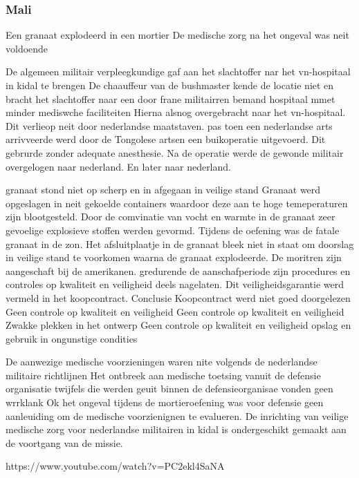 \cite{noauthor_2022-nm}
\cite{zetter2016GridHack}



\subsubsection{Mali}
Een granaat explodeerd in een mortier
De medische zorg na het ongeval was neit voldoende


De algemeen militair verpleegkundige gaf aan het slachtoffer nar het vn-hospitaal in kidal te brengen
De chaauffeur van de bushmaster kende de locatie niet  en bracht het slachtoffer naar een door frane militairren bemand hospitaal mmet minder mediswche faciliteiten
Hierna alsnog overgebracht naar het vn-hospitaal.
Dit verlieop  neit door nederlandse maatstaven.
pas toen een nederlandse arts arrivveerde werd door de Tongolese artsen een buikoperatie uitgevoerd.
Dit gebrurde zonder adequate anesthesie.
Na de operatie werde de gewonde militair overgelogen naar nederland. En later naar nederland.


granaat stond niet op scherp en in afgegaan in veilige stand
Granaat werd opgeslagen in neit gekoelde containers waardoor deze aan te hoge temeperaturen zijn blootgesteld.
Door de comvinatie van vocht en warmte in de granaat zeer gevoelige explosieve stoffen werden gevormd.
Tijdens de oefening was de fatale granaat in de zon.
Het afsluitplaatje in de granaat bleek niet in staat om doorslag in veilige stand te voorkomen waarna de granaat explodeerde.
De moritren zijn aangeschaft bij de amerikanen. gredurende de aanschafperiode zijn procedures en controles op kwaliteit en veiligheid deels nagelaten.
Dit veiligheidsgarantie werd vermeld in het koopcontract.
Conclusie
Koopcontract werd niet goed doorgelezen
Geen controle op kwaliteit en veiligheid
Geen controle op kwaliteit en veiligheid
Zwakke plekken in het ontwerp
Geen controle op kwaliteit en veiligheid
opslag en gebruik in ongunstige condities

De aanwezige medische voorzieningen waren nite volgends de nederlandse militaire richtlijnen
Het ontbreek aan medische toetsing vanuit de defensie organisatie
twijfels die werden geuit binnen de defensieorganisae vonden geen wrrklank
Ok het ongeval tijdens de mortieroefening was voor defensie geen aanleuiding om de medische voorzienignen te evalueren.
De inrichting van veilige medische zorg voor nederlandse militairen in kidal is ondergeschikt gemaakt aan de voortgang van de missie.


https://www.youtube.com/watch?v=PC2ekl4SaNA 






